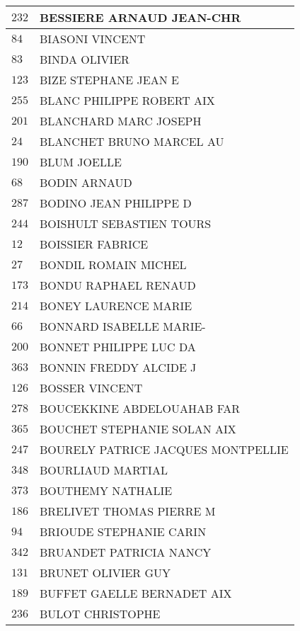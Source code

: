 \begin{xltabular}{\linewidth}{|l|X|}
    \hline
    $232$ & BESSIERE ARNAUD JEAN-CHR \\
    \hline
    $84$ & BIASONI VINCENT \\
    \hline
    $83$ & BINDA OLIVIER \\
    \hline
    $123$ & BIZE STEPHANE JEAN E \\
    \hline
    $255$ & BLANC PHILIPPE ROBERT AIX \\
    \hline
    $201$ & BLANCHARD MARC JOSEPH \\
    \hline
    $24$ & BLANCHET BRUNO MARCEL AU \\
    \hline
    $190$ & BLUM JOELLE \\
    \hline
    $68$ & BODIN ARNAUD \\
    \hline
    $287$ & BODINO JEAN PHILIPPE D \\
    \hline
    $244$ & BOISHULT SEBASTIEN TOURS \\
    \hline
    $12$ & BOISSIER FABRICE \\
    \hline
    $27$ & BONDIL ROMAIN MICHEL \\
    \hline
    $173$ & BONDU RAPHAEL RENAUD \\
    \hline
    $214$ & BONEY LAURENCE MARIE \\
    \hline
    $66$ & BONNARD ISABELLE MARIE- \\
    \hline
    $200$ & BONNET PHILIPPE LUC DA \\
    \hline
    $363$ & BONNIN FREDDY ALCIDE J \\
    \hline
    $126$ & BOSSER VINCENT \\
    \hline
    $278$ & BOUCEKKINE ABDELOUAHAB FAR \\
    \hline
    $365$ & BOUCHET STEPHANIE SOLAN AIX \\
    \hline
    $247$ & BOURELY PATRICE JACQUES MONTPELLIE \\
    \hline
    $348$ & BOURLIAUD MARTIAL \\
    \hline
    $373$ & BOUTHEMY NATHALIE \\
    \hline
    $186$ & BRELIVET THOMAS PIERRE M \\
    \hline
    $94$ & BRIOUDE STEPHANIE CARIN \\
    \hline
    $342$ & BRUANDET PATRICIA NANCY \\
    \hline
    $131$ & BRUNET OLIVIER GUY \\
    \hline
    $189$ & BUFFET GAELLE BERNADET AIX \\
    \hline
    $236$ & BULOT CHRISTOPHE \\

\end{xltabular}
